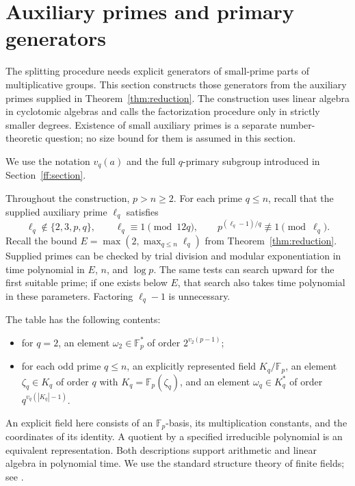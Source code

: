 \section{Auxiliary primes and primary generators}
\label{sec:table}

The splitting procedure needs explicit generators of small-prime parts of
multiplicative groups.  This section constructs those generators from the
auxiliary primes supplied in Theorem~\ref{thm:reduction}.
The construction uses linear algebra
in cyclotomic algebras and calls the factorization procedure only in strictly
smaller degrees.  Existence of small auxiliary primes is a separate
number-theoretic question; no size bound for them is assumed in this section.

We use the notation $v_q(a)$ and the full $q$-primary subgroup
introduced in Section~\ref{ff:section}.

Throughout the construction, $p>n\ge2$.  For each prime $q\le n$,
recall that the supplied auxiliary prime $\ell_q$ satisfies
\begin{equation}\label{table:primes}
 \ell_q\notin\{2,3,p,q\},\qquad
 \ell_q\equiv1\pmod{12q},\qquad
 p^{(\ell_q-1)/q}\not\equiv1\pmod{\ell_q}.
\end{equation}
Recall the bound $E=\max(2,\max_{q\le n}\ell_q)$ from
Theorem~\ref{thm:reduction}.  Supplied primes can be checked by trial
division and modular exponentiation in time polynomial in $E$, $n$, and
$\log p$.  The same tests can search upward for the first suitable prime;
if one exists below $E$, that search also takes time polynomial in these
parameters.  Factoring $\ell_q-1$ is unnecessary.

The table has the following contents:
\begin{itemize}
\item for $q=2$, an element $\omega_2\in\mathbb F_p^*$ of order
      $2^{v_2(p-1)}$;
\item for each odd prime $q\le n$, an explicitly represented field
      $K_q/\mathbb F_p$, an element $\zeta_q\in K_q$ of order $q$ with
      $K_q=\mathbb F_p(\zeta_q)$, and an element $\omega_q\in K_q^*$
      of order $q^{v_q(|K_q|-1)}$.
\end{itemize}
An explicit field here consists of an $\mathbb F_p$-basis, its
multiplication constants, and the coordinates of its identity.  A quotient
by a specified irreducible polynomial is an equivalent representation.
Both descriptions support arithmetic and linear algebra in polynomial time.
We use the standard structure theory of finite fields; see
\cite{LidlNiederreiter97}.

